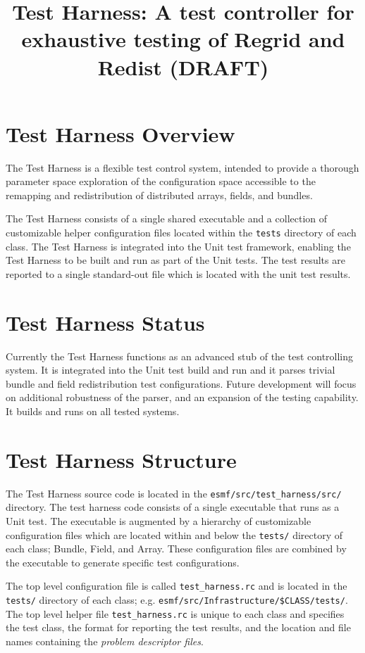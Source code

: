 \documentclass{article}
\begin{document}
\title{Test Harness: A test controller for exhaustive testing of Regrid and Redist (DRAFT)} 
\date{}
\maketitle

\section{Test Harness Overview}
The Test Harness is a flexible test control system, intended to provide a thorough parameter space exploration of the configuration space accessible to the remapping and redistribution of distributed arrays, fields, and bundles.

The Test Harness consists of a single shared executable and a collection of customizable helper configuration files located within the \texttt{tests} directory of each class. The Test Harness is integrated into the Unit test framework, enabling the Test Harness to be built and run as part of the Unit tests. The test results are reported to a single standard-out file which is located with the unit test results.

\section{Test Harness Status}
Currently the Test Harness functions as an advanced stub of the test controlling system. It is integrated into the Unit test build and run and it parses trivial bundle and field redistribution test configurations. Future development will focus on additional robustness of the parser, and an expansion of the testing capability. It builds and runs on all tested systems.
  
\section{Test Harness Structure}
The Test Harness source code is  located in the \texttt{esmf/src/test\_harness/src/} directory. The test harness code consists of a single executable that runs as a Unit test. The executable is augmented by a hierarchy  of customizable configuration files which are located within and below the \texttt{tests/} directory of each class; Bundle, Field, and Array. These configuration files are combined by the executable to generate specific test configurations. 

The top level configuration file is called \texttt{test\_harness.rc} and is located in the \texttt{tests/} directory of each class; e.g. \texttt{esmf/src/Infrastructure/\$CLASS/tests/}. The top level helper file \texttt{test\_harness.rc} is unique to each class and specifies the test class, the format for reporting the test results, and the location and file names containing the \textit{problem descriptor files}. 
\end{document}
